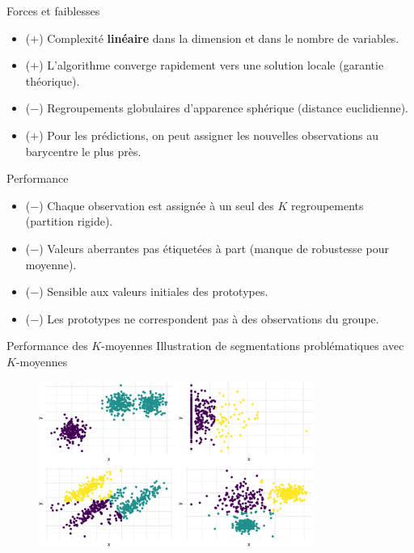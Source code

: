 \documentclass[
  ignorenonframetext,
]{beamer}
\providecommand{\tightlist}{%
  \setlength{\itemsep}{0pt}\setlength{\parskip}{0pt}}\usepackage{longtable,booktabs,array}
\begin{document}
\begin{frame}{Forces et faiblesses}
\protect\hypertarget{forces-et-faiblesses}{}
\begin{itemize}
\tightlist
\item
  (\(+\)) Complexité \textbf{linéaire} dans la dimension et dans le
  nombre de variables.
\item
  (\(+\)) L'algorithme converge rapidement vers une solution locale
  (garantie théorique).
\item
  (\(-\)) Regroupements globulaires d'apparence sphérique (distance
  euclidienne).
\item
  (\(+\)) Pour les prédictions, on peut assigner les nouvelles
  observations au barycentre le plus près.
\end{itemize}
\end{frame}

\begin{frame}{Performance}
\protect\hypertarget{performance}{}
\begin{itemize}
\tightlist
\item
  (\(-\)) Chaque observation est assignée à un seul des \(K\)
  regroupements (partition rigide).
\item
  (\(-\)) Valeurs aberrantes pas étiquetées à part (manque de robustesse
  pour moyenne).
\item
  (\(-\)) Sensible aux valeurs initiales des prototypes.
\item
  (\(-\)) Les prototypes ne correspondent pas à des observations du
  groupe.
\end{itemize}
\end{frame}

\begin{frame}{Performance des \(K\)-moyennes}
\protect\hypertarget{performance-des-k-moyennes}{}
Illustration de segmentations problématiques avec \(K\)-moyennes

\begin{figure}

{\centering \includegraphics[width=0.8\textwidth,height=\textheight]{MATH60602-diapos11_files/figure-beamer/kmoyperfo-1.pdf}

}

\end{figure}
\end{frame}
\end{document}
